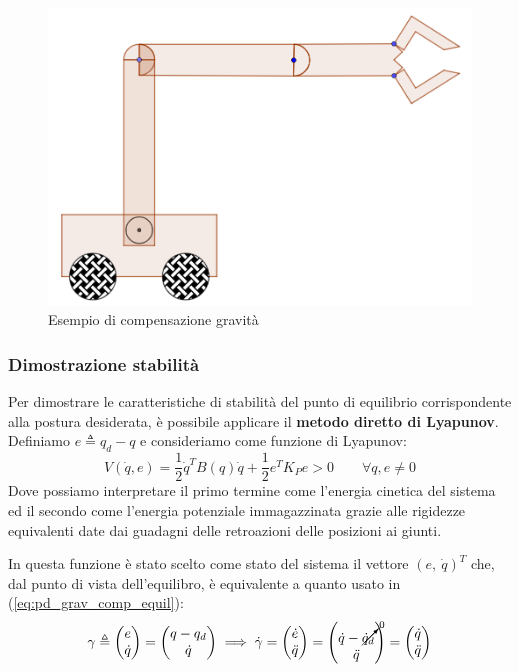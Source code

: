 \begin{figure}[H]
	\centering
	\includegraphics[width=0.5\linewidth]{images/centralized_control_pd_gravity_comp_example}
	\caption{Esempio di compensazione gravità}
	\label{fig:centralizedcontrolpdgravitycompexample}
\end{figure}




\vspace*{20pt}
\subsubsection{Dimostrazione stabilità}
\boldmath
Per dimostrare le caratteristiche di stabilità del punto di equilibrio corrispondente alla postura desiderata, è possibile applicare il \textbf{metodo diretto di Lyapunov}. Definiamo $e \triangleq q_d - q$ e consideriamo come funzione di Lyapunov:
$$
V(\dot{q}, e) = \frac{1}{2}\dot{q}^TB(q)\dot{q} + \frac{1}{2}e^TK_Pe > 0    \qquad \forall q,e\neq0
$$
Dove possiamo interpretare il primo termine come l’energia cinetica del sistema ed il secondo come l’energia potenziale immagazzinata grazie alle rigidezze equivalenti date dai guadagni delle retroazioni delle posizioni ai giunti.

In questa funzione è stato scelto come stato del sistema il vettore $(e, \ \dot{q})^T$ che, dal punto di vista dell'equilibro, è equivalente a quanto usato in (\ref{eq:pd_grav_comp_equil}):
\begin{gather*}
\gamma \triangleq \begin{pmatrix}e \\ \dot{q}\end{pmatrix} = \begin{pmatrix}q - q_d \\ \dot{q}\end{pmatrix}
\implies 
\dot{\gamma} = \begin{pmatrix}\dot{e} \\ \ddot{q}\end{pmatrix} = \begin{pmatrix}\dot{q} - \cancelto{0}{\dot{q}_d} \\ \ddot{q}\end{pmatrix} = \begin{pmatrix}\dot{q} \\ \ddot{q}\end{pmatrix}
\end{gather*}



